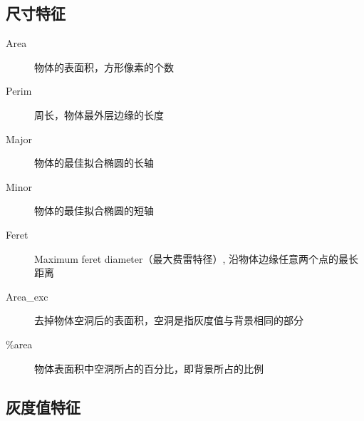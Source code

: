 \subsection{尺寸特征}

\begin{description}
\item[Area] 物体的表面积，方形像素的个数%
\item[Perim] 周长，物体最外层边缘的长度
\item[Major] 物体的最佳拟合椭圆的长轴%
\item[Minor] 物体的最佳拟合椭圆的短轴%
\item[Feret] Maximum feret diameter（最大费雷特径）, 沿物体边缘任意两个点的最长距离
\item[Area\_exc] 去掉物体空洞后的表面积，空洞是指灰度值与背景相同的部分
\item[\%area] 物体表面积中空洞所占的百分比，即背景所占的比例
\end{description}

\subsection{灰度值特征}

